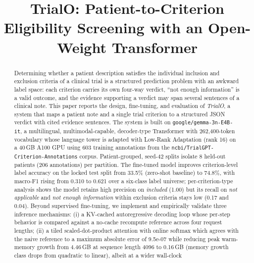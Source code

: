 \documentclass[conference]{IEEEtran}
\newcommand{\modelname}{\texttt{google/gemma-3n-E4B-it}}
\newcommand{\dataset}{\texttt{ncbi/TrialGPT-Criterion-Annotations}}
\begin{document}
\title{TrialO: Patient-to-Criterion Eligibility Screening with an Open-Weight Transformer}

\author{
}

\maketitle

\begin{abstract}
Determining whether a patient description satisfies the individual
inclusion and exclusion criteria of a clinical trial is a structured
prediction problem with an awkward label space: each criterion carries its
own four-way verdict, ``not enough information'' is a valid outcome, and
the evidence supporting a verdict may span several sentences of a clinical
note. This paper reports the design, fine-tuning, and evaluation of
\emph{TrialO}, a system that maps a patient note and a single trial
criterion to a structured JSON verdict with cited evidence sentences. The
system is built on \modelname{}, a multilingual, multimodal-capable,
decoder-type Transformer with 262{,}400-token vocabulary whose language
tower is adapted with Low-Rank Adaptation (rank 16) on a 40\,GB A100
GPU using 603 training annotations from the \dataset{} corpus.
Patient-grouped, seed-42 splits isolate 8 held-out patients (206
annotations) per partition. The fine-tuned model improves
criterion-level label accuracy on the locked test split from 33.5\%
(zero-shot baseline) to 74.8\%, with macro-F1 rising from 0.310 to
0.621 over a six-class label universe; per-criterion-type analysis shows
the model retains high precision on \emph{included} (1.00) but its
recall on \emph{not applicable} and \emph{not enough information}
within exclusion criteria stays low (0.17 and 0.04). Beyond supervised
fine-tuning, we implement and empirically validate three
inference mechanisms: (i) a KV-cached autoregressive decoding loop
whose per-step behavior is compared against a no-cache recompute
reference across four request lengths; (ii) a tiled scaled-dot-product
attention with online softmax which agrees with the naive reference to
a maximum absolute error of 9.5e-07 while reducing peak warm-memory
growth from
4.46\,GB at sequence length 4096 to 0.16\,GB (memory growth class drops
from quadratic to linear), albeit at a wider wall-clock

\end{abstract}
\end{document}
